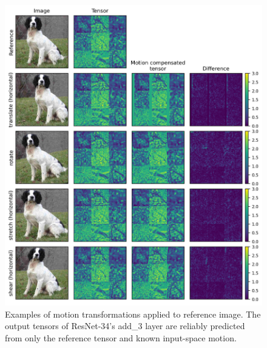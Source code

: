 \begin{figure}[htbp]
    \centering
    \includegraphics[width=0.95\linewidth]{img/video_latent_space_motion_analysis/examples.png}
    \caption[Example motion transformations and motion compensated tensors]{%
        Examples of motion transformations applied to reference image.
        The output tensors of ResNet-34's add\_3 layer are reliably predicted from only the reference tensor and known input-space motion. %
    }
    \label{fig:video_latent_space_motion_analysis/examples}
\end{figure}



